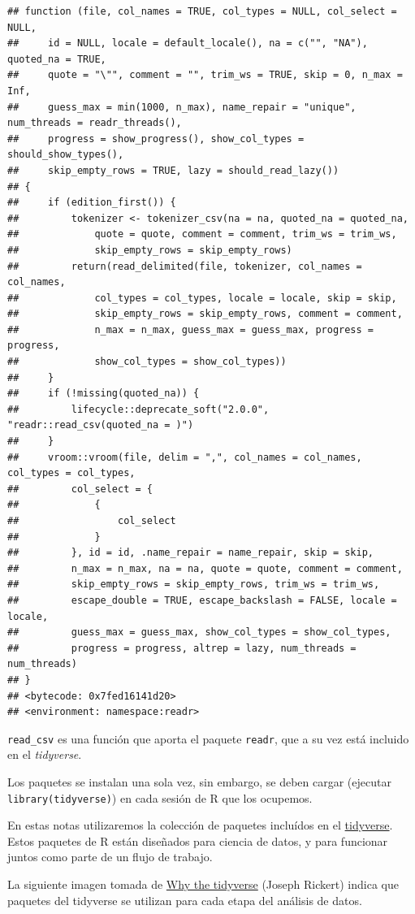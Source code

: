\documentclass[
]{book}
\begin{document}
\begin{verbatim}
## function (file, col_names = TRUE, col_types = NULL, col_select = NULL, 
##     id = NULL, locale = default_locale(), na = c("", "NA"), quoted_na = TRUE, 
##     quote = "\"", comment = "", trim_ws = TRUE, skip = 0, n_max = Inf, 
##     guess_max = min(1000, n_max), name_repair = "unique", num_threads = readr_threads(), 
##     progress = show_progress(), show_col_types = should_show_types(), 
##     skip_empty_rows = TRUE, lazy = should_read_lazy()) 
## {
##     if (edition_first()) {
##         tokenizer <- tokenizer_csv(na = na, quoted_na = quoted_na, 
##             quote = quote, comment = comment, trim_ws = trim_ws, 
##             skip_empty_rows = skip_empty_rows)
##         return(read_delimited(file, tokenizer, col_names = col_names, 
##             col_types = col_types, locale = locale, skip = skip, 
##             skip_empty_rows = skip_empty_rows, comment = comment, 
##             n_max = n_max, guess_max = guess_max, progress = progress, 
##             show_col_types = show_col_types))
##     }
##     if (!missing(quoted_na)) {
##         lifecycle::deprecate_soft("2.0.0", "readr::read_csv(quoted_na = )")
##     }
##     vroom::vroom(file, delim = ",", col_names = col_names, col_types = col_types, 
##         col_select = {
##             {
##                 col_select
##             }
##         }, id = id, .name_repair = name_repair, skip = skip, 
##         n_max = n_max, na = na, quote = quote, comment = comment, 
##         skip_empty_rows = skip_empty_rows, trim_ws = trim_ws, 
##         escape_double = TRUE, escape_backslash = FALSE, locale = locale, 
##         guess_max = guess_max, show_col_types = show_col_types, 
##         progress = progress, altrep = lazy, num_threads = num_threads)
## }
## <bytecode: 0x7fed16141d20>
## <environment: namespace:readr>
\end{verbatim}

\texttt{read\_csv} es una función que aporta el paquete \texttt{readr}, que a su vez está incluido en el
\emph{tidyverse}.

Los paquetes se instalan una sola vez, sin embargo, se deben cargar
(ejecutar \texttt{library(tidyverse)}) en cada sesión de R que los ocupemos.

En estas notas utilizaremos la colección de paquetes incluídos en el
\href{https://www.tidyverse.org/}{tidyverse}. Estos paquetes de R están
diseñados para ciencia de datos, y para funcionar juntos como parte de un flujo
de trabajo.

La siguiente imagen tomada de \href{https://rviews.rstudio.com/2017/06/08/what-is-the-tidyverse/}{Why the tidyverse} (Joseph
Rickert) indica que paquetes del tidyverse se utilizan para cada
etapa del análisis de datos.
\end{document}
